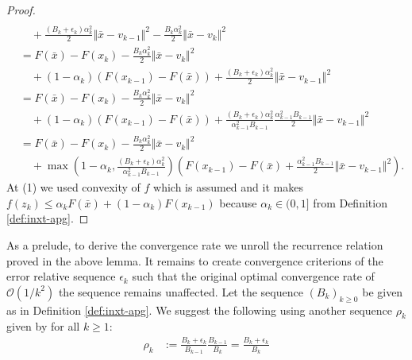 \documentclass[12pt]{article}
\begin{document}
\begin{proof}
\begin{align*}
                \\ &\quad 
                + \frac{(B_k + \epsilon_k)\alpha_k^2}{2}\Vert \bar x - v_{k - 1} \Vert^2
                - \frac{B_k\alpha_k^2}{2}\Vert \bar x - v_k\Vert^2
            \\
            &= 
            F(\bar x) - F(x_k) 
            - \frac{B_k\alpha_k^2}{2}\Vert \bar x - v_k\Vert^2
                \\ &\quad 
                + (1 - \alpha_k)(F(x_{k - 1}) - F(\bar x))
                + \frac{(B_k + \epsilon_k)\alpha_k^2}{2}\Vert \bar x - v_{k - 1} \Vert^2
            \\
            &= F(\bar x) - F(x_k) 
            - \frac{B_k\alpha_k^2}{2}\Vert \bar x - v_k\Vert^2
                \\ &\quad
                + (1 - \alpha_k)(F(x_{k - 1}) - F(\bar x))
                + \frac{(B_k + \epsilon_k)\alpha_k^2}{\alpha_{k - 1}^2B_{k - 1}}\frac{\alpha_{k - 1}^2B_{k - 1}}{2}\Vert \bar x - v_{k - 1}\Vert^2
            \\
            &= 
            F(\bar x) - F(x_k) - \frac{B_k\alpha_k^2}{2}\Vert \bar x - v_k\Vert^2
            \\ &\quad 
            + \max\left(
                1 - \alpha_k, 
                \frac{(B_k + \epsilon_k)\alpha_k^2}{\alpha_{k - 1}^2B_{k - 1}}
            \right)
            \left(
                F(x_{k - 1}) - F(\bar x) 
                + \frac{\alpha_{k - 1}^2B_{k - 1}}{2}\Vert \bar x - v_{k - 1} \Vert^2
            \right). 
        \end{align*}
        At (1) we used convexity of $f$ which is assumed and it makes $f(z_k) \le \alpha_k F(\bar x) + (1 - \alpha_k)F(x_{k - 1})$ because $\alpha_k \in (0, 1]$ from Definition \ref{def:inxt-apg}. 
    \end{proof}
    \par
    As a prelude, to derive the convergence rate we unroll the recurrence relation proved in the above lemma.
    It remains to create convergence criterions of the error relative sequence $\epsilon_k$ such that the original optimal convergence rate of $\mathcal O(1/k^2)$ the sequence remains unaffected. 
    Let the sequence $(B_k)_{k \ge 0}$ be given as in Definition \ref{def:inxt-apg}. 
    We suggest the following using another sequence $\rho_k$ given by for all $k \ge 1$: 
    \begin{align*}
        \rho_k &:= \frac{B_k + \epsilon_k}{B_{k - 1}}\frac{B_{k - 1}}{B_k} = \frac{B_k + \epsilon_k}{B_k}
    \end{align*}
\end{document}
